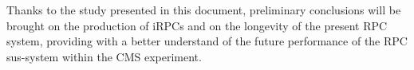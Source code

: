 Thanks to the study presented in this document, preliminary conclusions will be brought on the production of iRPCs and on the longevity of the present RPC system, providing with a better understand of the future performance of the RPC sus-system within the CMS experiment.

\clearpage{\pagestyle{empty}\cleardoublepage}